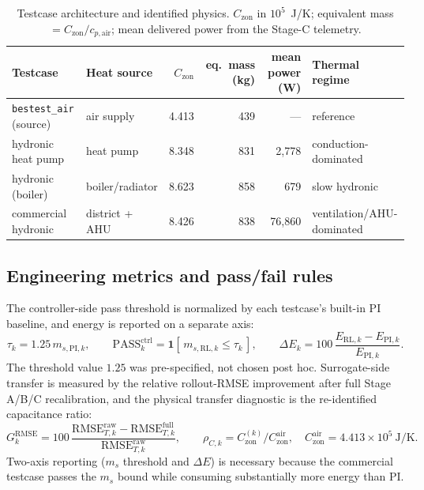 \documentclass[11pt,a4paper]{article}
\begin{document}
\begin{table}[H]
\centering
\small
\caption{Testcase architecture and identified physics. $C_{\mathrm{zon}}$ in $10^5$~J/K; equivalent mass $=C_{\mathrm{zon}}/c_{p,\mathrm{air}}$; mean delivered power from the Stage-C telemetry.}
\label{tab:physics}
\begin{tabularx}{\linewidth}{l l r r r >{\raggedright\arraybackslash}X}
\toprule
Testcase & Heat source & $C_{\mathrm{zon}}$ & eq.\ mass (kg) & mean power (W) & Thermal regime \\
\midrule
\texttt{bestest\_air} (source) & air supply & 4.413 & 439 & --- & reference \\
\midrule
hydronic heat pump & heat pump & 8.348 & 831 & 2,778 & conduction-dominated \\
hydronic (boiler) & boiler/radiator & 8.623 & 858 & 679 & slow hydronic \\
commercial hydronic & district + AHU & 8.426 & 838 & 76,860 & ventilation/AHU-dominated \\
\bottomrule
\end{tabularx}
\end{table}

\subsection{Engineering metrics and pass/fail rules}

The controller-side pass threshold is normalized by each testcase's built-in PI baseline, and energy is reported on a separate axis:
\begin{equation}
  \tau_k = 1.25\,m_{s,\mathrm{PI},k},
  \qquad
  \mathrm{PASS}^{\mathrm{ctrl}}_k = \mathbf{1}\!\left[\,m_{s,\mathrm{RL},k} \le \tau_k\,\right],
  \qquad
  \Delta E_k = 100\,\frac{E_{\mathrm{RL},k}-E_{\mathrm{PI},k}}{E_{\mathrm{PI},k}}.
  \label{eq:threshold}
\end{equation}
The threshold value $1.25$ was pre-specified, not chosen post hoc. Surrogate-side transfer is measured by the relative rollout-RMSE improvement after full Stage A/B/C recalibration, and the physical transfer diagnostic is the re-identified capacitance ratio:
\begin{equation}
  G^{\mathrm{RMSE}}_k = 100\,\frac{\mathrm{RMSE}^{\mathrm{raw}}_{T,k}-\mathrm{RMSE}^{\mathrm{full}}_{T,k}}{\mathrm{RMSE}^{\mathrm{raw}}_{T,k}},
  \qquad
  \rho_{C,k} = C^{(k)}_{\mathrm{zon}} \big/ C^{\mathrm{air}}_{\mathrm{zon}},
  \quad C^{\mathrm{air}}_{\mathrm{zon}} = 4.413\times10^5~\mathrm{J/K}.
  \label{eq:gain_ratio}
\end{equation}
Two-axis reporting ($m_s$ threshold and $\Delta E$) is necessary because the commercial testcase passes the $m_s$ bound while consuming substantially more energy than PI.
\end{document}

